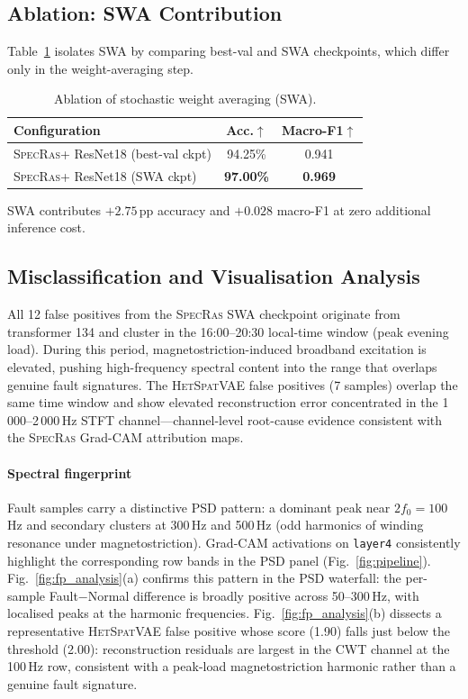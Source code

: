 \documentclass[preprint,12pt,3p]{elsarticle}
\newcommand{\zerone}{\textsc{SpecRas}\xspace}      %
\newcommand{\hetspatvae}{\textsc{HetSpatVAE}\xspace} %
\newcommand{\hczv}{\hetspatvae}                    %
\begin{document}
\subsection{Ablation: SWA Contribution}
\label{sec:ablation}

Table~\ref{tab:ablation} isolates SWA by comparing best-val and SWA
checkpoints, which differ only in the weight-averaging step.

\begin{table}[H]
  \centering
  \small
  \caption{Ablation of stochastic weight averaging (SWA).}
  \label{tab:ablation}
  \renewcommand{\arraystretch}{1.2}
  \begin{tabular}{@{}p{4cm}cc@{}}
    \toprule
    Configuration & Acc.$\uparrow$ & Macro-F1$\uparrow$ \\
    \midrule
    \zerone + ResNet18 (best-val ckpt) & 94.25\% & 0.941 \\
    \zerone + ResNet18 (SWA ckpt)      & \textbf{97.00\%} & \textbf{0.969} \\
    \bottomrule
  \end{tabular}
\end{table}

SWA contributes $+2.75$\,pp accuracy and $+0.028$ macro-F1 at zero
additional inference cost.

\subsection{Misclassification and Visualisation Analysis}
\label{sec:viz}

All 12 false positives from the \zerone SWA checkpoint originate from
transformer 134 and cluster in the 16:00--20:30 local-time window
(peak evening load).
During this period, mag\-net\-o\-stric\-tion-in\-duced broadband excitation is
elevated, pushing high-frequency spectral content into the range that
overlaps genuine fault signatures.
The \hczv false positives (7 samples) overlap the same time window and
show elevated reconstruction error concentrated in the 1\,000--2\,000\,Hz
STFT channel---channel-level root-cause evidence consistent with the
\zerone Grad-CAM attribution maps.

\paragraph{Spectral fingerprint}
Fault samples carry a distinctive PSD pattern: a dominant peak near
$2f_0 = 100$\,Hz and secondary clusters at 300\,Hz and 500\,Hz
(odd harmonics of winding resonance under magnetostriction).
Grad-CAM activations on \texttt{layer4} consistently highlight the
corresponding row bands in the PSD panel (Fig.~\ref{fig:pipeline}).
Fig.~\ref{fig:fp_analysis}(a) confirms this pattern in the PSD
waterfall: the per-sample Fault$-$Normal difference is broadly
positive across 50--300\,Hz, with localised peaks at the harmonic
frequencies.
Fig.~\ref{fig:fp_analysis}(b) dissects a representative \hczv false
positive whose score (1.90) falls just below the threshold (2.00):
reconstruction residuals are largest in the CWT channel at the 100\,Hz
row, consistent with a peak-load magnetostriction harmonic rather than
a genuine fault signature.
\end{document}
